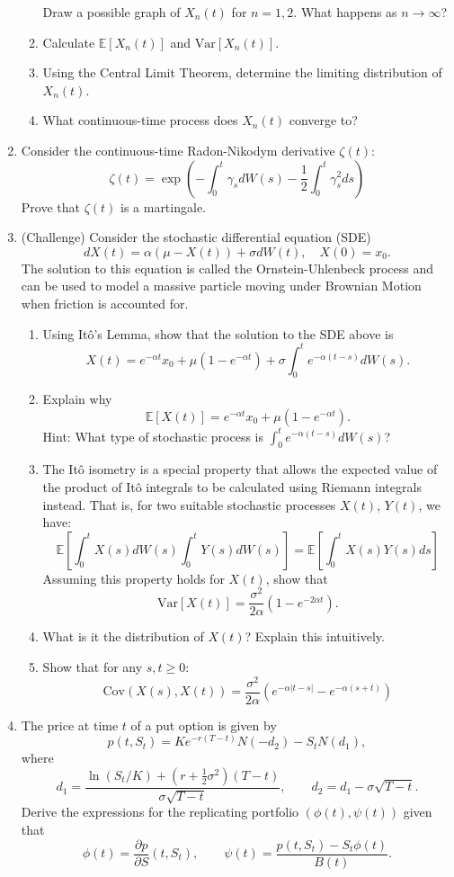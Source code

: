 \documentclass[11pt]{article}
\newcommand{\E}{\mathbb{E}}
\begin{document}
\begin{enumerate}
\begin{enumerate}
				Draw a possible graph of $X_{n}(t)$ for $n=1,2$. What happens as $n\to\infty$?
				\item Calculate $\E[X_{n}(t)]$ and $\text{Var}[X_{n}(t)]$.
				\item Using the Central Limit Theorem, determine the limiting distribution of $X_{n}(t)$.
				\item What continuous-time process does $X_{n}(t)$ converge to?
			\end{enumerate}
		\item Consider the continuous-time Radon-Nikodym derivative $\zeta(t)$:
		\[	\zeta(t) = \exp\left(-\int_{0}^{t}\gamma_{s}dW(s) -\frac{1}{2} \int_{0}^{t}\gamma_{s}^{2}ds\right)
			\]
		Prove that $\zeta(t)$ is a martingale.
		\item (Challenge) Consider the stochastic differential equation (SDE)
		\[	dX(t) = \alpha(\mu - X(t))+ \sigma dW(t),\quad X(0) = x_{0}.
		\]
		The solution to this equation is called the Ornstein-Uhlenbeck process and can be used to model a massive particle moving under Brownian Motion when friction is accounted for.
		\begin{enumerate}
			\item Using It\^{o}'s Lemma, show that the solution to the SDE above 
			is 
			\[	X(t) = e^{-\alpha t}x_{0} + \mu(1 - e^{-\alpha t}) + \sigma\int_{0}^{t}e^{-\alpha(t - s)}dW(s).
			\]
			\item Explain why 
			\[	\E[X(t)] = e^{-\alpha t}x_{0} + \mu(1 - e^{-\alpha t}).
				\]
			Hint: What type of stochastic process is $\int_{0}^{t}e^{-\alpha(t - s)}dW(s)$?
			\item The It\^{o} isometry is a special property that allows the expected value of the product of It\^{o} integrals to be calculated using Riemann integrals instead. That is, for two suitable stochastic processes $X(t)$, $Y(t)$, we have:
			\[	\E\left[\int_{0}^{t}X(s)dW(s)\int_{0}^{t}Y(s)dW(s)\right]
				 = \E\left[\int_{0}^{t}X(s)Y(s)ds\right]
				\]
			Assuming this property holds for $X(t)$, show that
			\[	\text{Var}[X(t)] = \frac{\sigma^{2}}{2\alpha}(1 - e^{-2\alpha t}).
				\]
			\item What is it the distribution of $X(t)$? Explain this intuitively.
			\item Show that for any $s, t\geq 0$:
			\[	\text{Cov}(X(s), X(t)) = \frac{\sigma^{2}}{2\alpha}(e^{-\alpha|t - s|} - e^{-\alpha(s + t)})
				\]
		\end{enumerate}
	\item The price at time $t$ of a put option is given by 
	\[		p(t, S_t) = Ke^{-r(T - t)}N(-d_{2}) - S_t N(d_1),
				\]
	where
	\[		d_{1} = \frac{\ln(S_t/ K) + (r + \frac{1}{2}\sigma^2)(T -t)}{\sigma \sqrt{T - t}},\qquad d_{2} = d_{1} - \sigma \sqrt{T - t}.
			\]
	Derive the expressions for the replicating portfolio $(\phi(t), \psi(t))$ given that
	\[		\phi(t) = \frac{\partial p}{\partial S}(t, S_t),\qquad \psi(t)=\frac{p(t, S_t) - S_t \phi(t)}{B(t)}.
			\]
	\end{enumerate}
\end{document}
